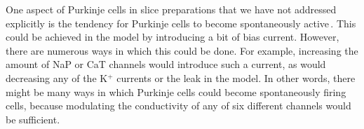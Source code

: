 \documentclass[12pt]{article}
\begin{document}
One aspect of Purkinje cells in slice preparations that we
have not addressed explicitly is the tendency for Purkinje
cells to become spontaneously active\,\cite{R:1980ly}. This could be achieved in the model by introducing
a bit of bias current. However, there are numerous ways
in which this could be done. For example, increasing the
amount of NaP or CaT channels would introduce such a
current, as would decreasing any of the K$^+$ currents or the
leak in the model. In other words, there might be many
ways in which Purkinje cells could become spontaneously
firing cells, because modulating the conductivity of any of
six different channels would be sufficient.



\end{document}
